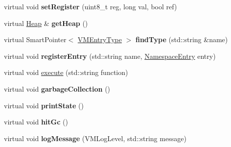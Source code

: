 \begin{DoxyCompactItemize}
\item 
\hypertarget{class_v_m_1_1_virtual_machine_af4da2b5077db8bad2574b35bc1a2bb31}{virtual void {\bfseries set\-Register} (uint8\-\_\-t reg, long val, bool ref)}\label{class_v_m_1_1_virtual_machine_af4da2b5077db8bad2574b35bc1a2bb31}

\item 
\hypertarget{class_v_m_1_1_virtual_machine_a30fb1469c9f436093c06529b257abfb8}{virtual \hyperlink{class_v_m_1_1_heap}{Heap} \& {\bfseries get\-Heap} ()}\label{class_v_m_1_1_virtual_machine_a30fb1469c9f436093c06529b257abfb8}

\item 
\hypertarget{class_v_m_1_1_virtual_machine_a8d4510cfe0d9b788966e1d775f5e9e0c}{virtual Smart\-Pointer$<$ \hyperlink{class_v_m_1_1_v_m_entry_type}{V\-M\-Entry\-Type} $>$ {\bfseries find\-Type} (std\-::string \&name)}\label{class_v_m_1_1_virtual_machine_a8d4510cfe0d9b788966e1d775f5e9e0c}

\item 
\hypertarget{class_v_m_1_1_virtual_machine_afe501e1ac466c1799cbbc32db282fdf1}{virtual void {\bfseries register\-Entry} (std\-::string name, \hyperlink{class_v_m_1_1_namespace_entry}{Namespace\-Entry} entry)}\label{class_v_m_1_1_virtual_machine_afe501e1ac466c1799cbbc32db282fdf1}

\item 
virtual void \hyperlink{class_v_m_1_1_virtual_machine_addc13d6dc68198f867b7ff8e21746af7}{execute} (std\-::string function)
\item 
\hypertarget{class_v_m_1_1_virtual_machine_a8853383f555a506d8ee35b68683e18db}{virtual void {\bfseries garbage\-Collection} ()}\label{class_v_m_1_1_virtual_machine_a8853383f555a506d8ee35b68683e18db}

\item 
\hypertarget{class_v_m_1_1_virtual_machine_a3f19073759247713fb74a1f32f9c66cc}{virtual void {\bfseries print\-State} ()}\label{class_v_m_1_1_virtual_machine_a3f19073759247713fb74a1f32f9c66cc}

\item 
\hypertarget{class_v_m_1_1_virtual_machine_aadc8e41bda5ca137388e7dc6e34c48c1}{virtual void {\bfseries hit\-Gc} ()}\label{class_v_m_1_1_virtual_machine_aadc8e41bda5ca137388e7dc6e34c48c1}

\item 
\hypertarget{class_v_m_1_1_virtual_machine_a3b45f03fa8a5898a19b1afde2e6f68ba}{virtual void {\bfseries log\-Message} (V\-M\-Log\-Level, std\-::string message)}\label{class_v_m_1_1_virtual_machine_a3b45f03fa8a5898a19b1afde2e6f68ba}

\end{DoxyCompactItemize}


